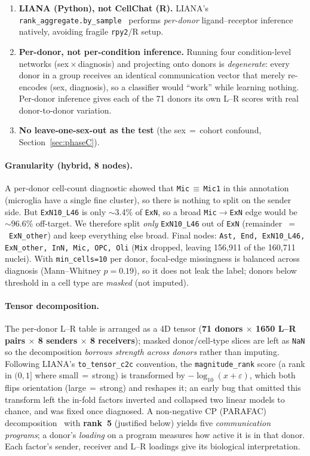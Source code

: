 \documentclass[11pt]{article}
\newcommand{\code}[1]{\texttt{\small #1}}
\begin{document}
\begin{enumerate}
\item \textbf{LIANA (Python), not CellChat (R).} LIANA's
\code{rank\_aggregate.by\_sample}~\cite{liana2022} performs \emph{per-donor}
ligand--receptor inference natively, avoiding fragile \code{rpy2}/R setup.
\item \textbf{Per-donor, not per-condition inference.} Running four
condition-level networks (sex\,$\times$\,diagnosis) and projecting onto donors is
\emph{degenerate}: every donor in a group receives an identical communication
vector that merely re-encodes (sex, diagnosis), so a classifier would ``work''
while learning nothing. Per-donor inference gives each of the 71 donors its own
L--R scores with real donor-to-donor variation.
\item \textbf{No leave-one-sex-out as the test} (the sex\,$=$\,cohort confound,
Section~\ref{sec:phaseC}).
\end{enumerate}

\paragraph{Granularity (hybrid, 8 nodes).} A per-donor cell-count diagnostic
showed that \code{Mic}\,$\equiv$\,\code{Mic1} in this annotation (microglia have
a single fine cluster), so there is nothing to split on the sender side. But
\code{ExN10\_L46} is only $\sim$3.4\% of \code{ExN}, so a broad
\code{Mic}$\rightarrow$\code{ExN} edge would be $\sim$96.6\% off-target. We
therefore split \emph{only} \code{ExN10\_L46} out of \code{ExN}
(remainder~$=$~\code{ExN\_other}) and keep everything else broad. Final nodes:
\code{Ast, End, ExN10\_L46, ExN\_other, InN, Mic, OPC, Oli} (\code{Mix}
dropped, leaving 156{,}911 of the 160{,}711 nuclei). With \code{min\_cells=10} per donor,
focal-edge missingness is balanced across diagnosis (Mann--Whitney $p=0.19$), so
it does not leak the label; donors below threshold in a cell type are
\emph{masked} (not imputed).

\paragraph{Tensor decomposition.} The per-donor L--R table is arranged as a 4D
tensor (\textbf{71 donors $\times$ 1650 L--R pairs $\times$ 8 senders $\times$ 8
receivers}); masked donor/cell-type slices are left as \code{NaN} so the
decomposition \emph{borrows strength across donors} rather than imputing.
Following LIANA's \code{to\_tensor\_c2c} convention, the \code{magnitude\_rank}
score (a rank in $(0,1]$ where small\,$=$\,strong) is transformed by
$-\log_{10}(x+\varepsilon)$, which both flips orientation (large\,$=$\,strong)
and reshapes it; an early bug that omitted this transform left the in-fold
factors inverted and collapsed two linear models to chance, and was fixed once
diagnosed. A non-negative CP (PARAFAC) decomposition~\cite{tensorc2c,tensorly}
with \textbf{rank~5} (justified below) yields
five \emph{communication programs}; a
donor's \emph{loading} on a program measures how active it is in that donor.
Each factor's sender, receiver and L--R loadings give its biological
interpretation.
\end{document}
